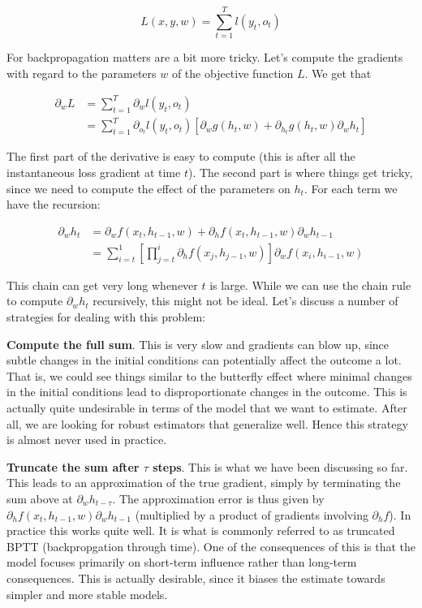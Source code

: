 $$L(x,y, w) = \sum_{t=1}^T l(y_t, o_t)$$

For backpropagation matters are a bit more tricky. Let’s compute the gradients with regard to the parameters $w$ of the objective function $L$. We get that

$$
\begin{aligned}
\partial_{w} L & = \sum_{t=1}^T \partial_w l(y_t, o_t) \\
    & = \sum_{t=1}^T \partial_{o_t} l(y_t, o_t) \left[\partial_w g(h_t, w) + \partial_{h_t} g(h_t,w) \partial_w h_t\right]
\end{aligned}
$$

The first part of the derivative is easy to compute (this is after all the instantaneous loss gradient at time $t$). The second part is where things get tricky, since we need to compute the effect of the parameters on $h_t$. For each term we have the recursion:

$$
\begin{aligned}
    \partial_w h_t & = \partial_w f(x_t, h_{t-1}, w) + \partial_h f(x_t, h_{t-1}, w) \partial_w h_{t-1} \\
    & = \sum_{i=t}^1 \left[\prod_{j=t}^i \partial_h f(x_j, h_{j-1}, w) \right] \partial_w f(x_{i}, h_{i-1}, w)
\end{aligned}
$$

This chain can get very long whenever $t$ is large. While we can use the chain rule to compute $\partial_w h_t$ recursively, this might not be ideal. Let’s discuss a number of strategies for dealing with this problem:

\textbf{Compute the full sum}. This is very slow and gradients can blow up, since subtle changes in the initial conditions can potentially affect the outcome a lot. That is, we could see things similar to the butterfly effect where minimal changes in the initial conditions lead to disproportionate changes in the outcome. This is actually quite undesirable in terms of the model that we want to estimate. After all, we are looking for robust estimators that generalize well. Hence this strategy is almost never used in practice.

\textbf{Truncate the sum after $\tau$ steps}. This is what we have been discussing so far. This leads to an approximation of the true gradient, simply by terminating the sum above at $\partial_w h_{t-\tau}$. The approximation error is thus given by $\partial_h f(x_t, h_{t-1}, w) \partial_w h_{t-1}$ (multiplied by a product of gradients involving $\partial_h f$). In practice this works quite well. It is what is commonly referred to as truncated BPTT (backpropgation through time). One of the consequences of this is that the model focuses primarily on short-term influence rather than long-term consequences. This is actually desirable, since it biases the estimate towards simpler and more stable models.

